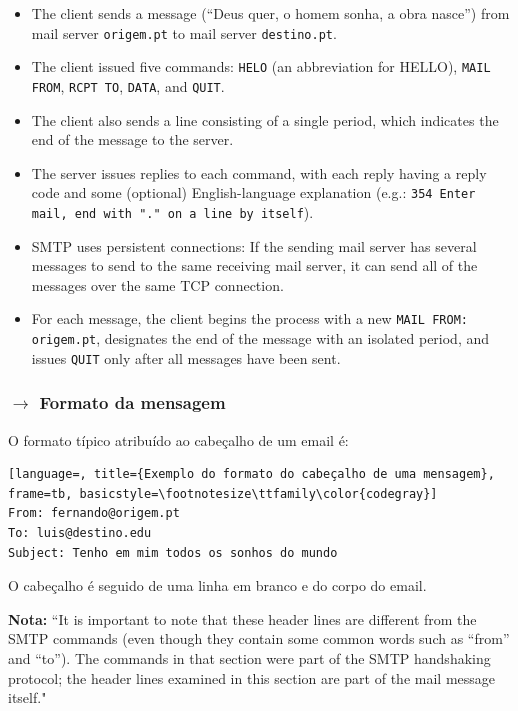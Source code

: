 \begin{itemize}
    \item The client sends a message (``Deus quer, o homem sonha, a obra nasce'') from mail server \texttt{origem.pt} to mail server \texttt{destino.pt}.
    
    \item The client issued five commands: \texttt{HELO} (an abbreviation for HELLO), \texttt{MAIL FROM}, \texttt{RCPT TO}, \texttt{DATA}, and \texttt{QUIT}.
    
    \item The client also sends a line consisting of a single period, which indicates the end of the message to the server.
    
    \item The server issues replies to each command, with each reply having a reply code and some (optional) English-language explanation (e.g.: \texttt{354 Enter mail, end with "." on a line by itself}).
    \item SMTP uses persistent connections: If the sending mail server has several messages to send to the same receiving mail server, it can send all of the messages over the same TCP connection.
    
    \item For each message, the client begins the process with a new \texttt{MAIL FROM: origem.pt}, designates the end of the message with an isolated period, and issues \texttt{QUIT} only after all messages have been sent.
\end{itemize}
\subsubsection[2.3.2 Formato da mensagem]{$\pmb{\rightarrow}$ Formato da mensagem}%
O formato típico atribuído ao cabeçalho de um email é:
\begin{lstlisting}[language=, title={Exemplo do formato do cabeçalho de uma mensagem}, frame=tb, basicstyle=\footnotesize\ttfamily\color{codegray}]
From: fernando@origem.pt
To: luis@destino.edu
Subject: Tenho em mim todos os sonhos do mundo
\end{lstlisting}
\noindent O cabeçalho é seguido de uma linha em branco e do corpo do email.

\vspace{1 em}
\noindent \textbf{Nota:} ``It is important to note that these header lines are different from the SMTP commands (even though they contain some common words such as “from” and “to”). The commands in that section were part of the SMTP handshaking protocol; the header lines examined in this section are part of
the mail message itself."\cite{Kurose2017}

